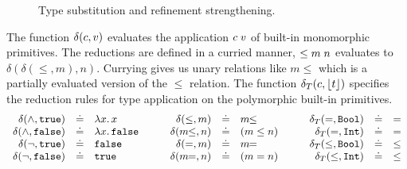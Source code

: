 \begin{figure}
  \vspace{-0.00cm}
  \caption{Type substitution and refinement strengthening.} 
  \label{fig:type-subst}
  \end{figure}
  

%
The function $\delta(c, v)$ 
evaluates the application ${c}\;{v}$ 
of built-in monomorphic primitives.
%
The reductions are defined in a curried 
manner, \ie 
${{\leq}\;{m}}\;{n}$ evaluates to $\delta(\delta(\leq,m),n)$. 
%
Currying gives us unary relations like $m\!\!\leq$ 
which is a partially evaluated version of the $\leq$ relation.
%
The function $\delta_T(c, \lfloor{\ensuremath{t}}\rfloor)$
specifies the reduction rules for type 
application on the polymorphic 
built-in primitives. %
%
$$\begin{array}{rclrclrcl}
\delta(\wedge,{\tt true}) & \defeq & \lambda x.\, x &
\delta(\leq,m) & \defeq & m\!\!\leq  & 
    \delta_T(=, \tbool) & \defeq & =  \\
\delta(\wedge,{\tt false}) & \defeq & \lambda x.\, {\tt false}\quad\quad &
\delta(m\!\!\leq, n) & \defeq & {\tt}(m \leq n) \quad\quad&
\delta_T(=, \tint) & \defeq & = \\
\delta(\neg,{\tt true}) & \defeq & {\tt false} & 
\delta(=,m) & \defeq & m\!\!= &
\delta_T(\leq, \tbool) & \defeq & \leq  \\
  \delta(\neg,{\tt false}) & \defeq &  {\tt true} &
  \delta(m\!\!=, n) & \defeq &  {\tt}(m = n) &
  \delta_T(\leq, \tint) & \defeq & \leq  \\
%
\end{array}$$
         
